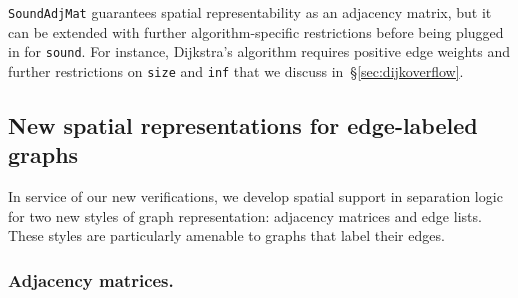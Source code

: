\texttt{SoundAdjMat} guarantees spatial representability 
as an adjacency matrix, but it can be extended with further 
algorithm-specific restrictions before
being plugged in for \texttt{sound}. For instance, Dijkstra's algorithm 
requires positive edge weights and further restrictions on 
\texttt{size} and \texttt{inf} that we discuss in~\S\ref{sec:dijkoverflow}.

\subsection{New spatial representations for edge-labeled graphs}

In service of our new verifications, we develop spatial support in separation 
logic for two new styles of graph representation:
adjacency matrices and edge lists. These styles are particularly
amenable to graphs that label their edges.


\subsubsection{Adjacency matrices.}

